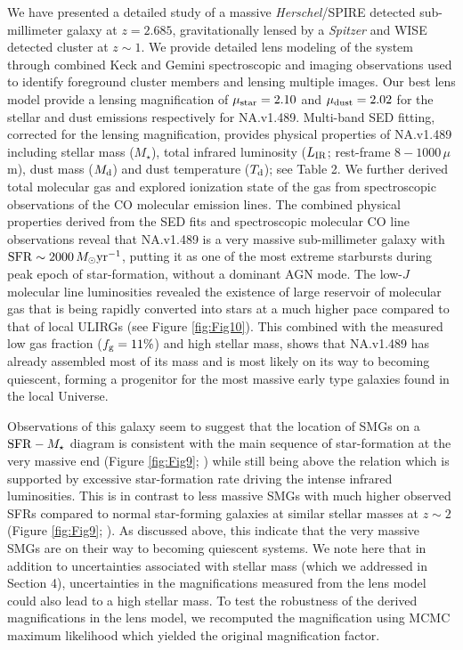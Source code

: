 \documentclass[iop,apj,useAMS,usenatbib]{emulateapj-rtx4}
\begin{document}
We have presented a detailed study of a massive {\it
    Herschel}/SPIRE detected sub-millimeter galaxy at $z=2.685$,
  gravitationally lensed by a {\it Spitzer} and WISE detected
  cluster at $z\sim1$. We provide detailed lens modeling of the system through combined Keck and Gemini spectroscopic and imaging
  observations used to identify foreground cluster members and lensing
  multiple images. Our best lens model provide a lensing
  magnification of $\mu_{\rm star}=2.10$ and $\mu_{\rm dust}=2.02$ for the stellar and dust
  emissions respectively for NA.v1.489. Multi-band SED fitting, corrected for the lensing
  magnification, provides physical properties of NA.v1.489 including
  stellar mass ($M_{\star}$), total infrared luminosity ($L_{\rm IR}$;
  rest-frame $8-1000\,\mu$m), dust mass ($M_{\rm d}$) and dust
  temperature ($T_{\rm d}$); see Table 2. We further derived total
  molecular gas and explored ionization state of the gas from
  spectroscopic observations of the CO molecular emission lines. The
  combined physical properties derived from the SED fits and
  spectroscopic molecular CO line observations reveal that NA.v1.489 is a
  very massive sub-millimeter galaxy with ${\rm
    SFR}\sim2000\,M_{\odot}{\rm yr^{-1}}$, putting it as one of the most
  extreme starbursts during peak epoch of star-formation, without a
  dominant AGN mode. The
  low-$J$ molecular line luminosities revealed the existence of large
  reservoir of molecular gas that is being rapidly converted into
  stars at a much higher pace compared to that of local ULIRGs (see
  Figure \ref{fig:Fig10}). This combined with the measured low gas fraction ($f_{\rm g}=11\%$) and
  high stellar mass, shows that NA.v1.489 has already assembled most of
  its mass and is most likely on its way to becoming quiescent,
  forming a progenitor for the most massive early type galaxies
  found in the local Universe. 

Observations of this galaxy seem to suggest that the location of SMGs
on a ${\rm SFR}-M_{\star}$ diagram is consistent with the main
sequence of star-formation at the very massive end (Figure \ref{fig:Fig9};
\citealp{Speagle2014}) while still being above the relation which is supported by
excessive star-formation rate driving the intense infrared
luminosities. This is in contrast to less massive SMGs with much
higher observed SFRs compared to normal star-forming galaxies at
similar stellar masses at $z\sim2$ (Figure \ref{fig:Fig9};
\citealp{Tacconi2010,Magnelli2012}). As discussed above, this indicate that the very
massive SMGs are on their way to becoming quiescent systems. We note
here that in addition to uncertainties associated with stellar mass (which we addressed
in Section 4), uncertainties in the magnifications measured from the lens model could also
lead to a high stellar mass. To test the robustness of the derived
magnifications in the lens model, we recomputed the magnification
using MCMC maximum likelihood which yielded the original magnification factor.
\end{document}
